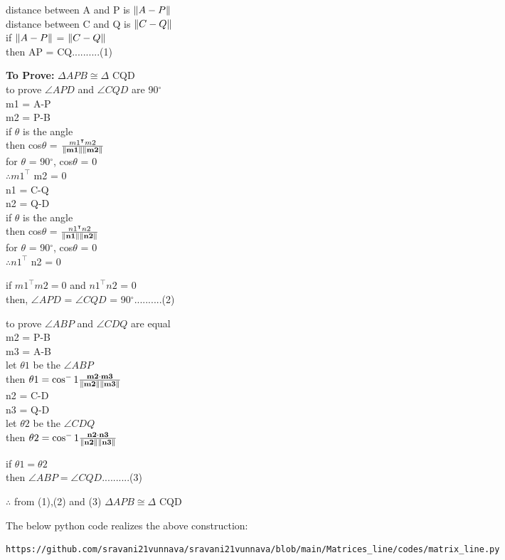 \documentclass[10pt, a4paper]{article}
\let\vec\mathbf
\begin{document}
	distance between A and P is $\norm{A-P}$\\
	distance between C and Q is $\norm{C-Q}$\\
	if $\norm{A-P}$ =  $\norm{C-Q}$\\
	then AP = CQ..........(1)
	
	\textbf{To Prove:}  $\Delta APB \cong \Delta$ CQD\\
	to prove $\angle {APD}$ and $\angle {CQD}$ are 90$^{\circ}$\\
	m1 = A-P\\
	m2 = P-B\\
	if $\theta$ is the angle\\
	then cos$\theta$ = $\frac{m1^\intercal m2}{\norm{\vec{m1}}\norm{\vec{m2}}}$\\
	for $\theta$ = 90$^{\circ}$, cos$\theta$ = 0\\
	$\therefore m1^\intercal$ m2 = 0\\
	n1 = C-Q\\
	n2 = Q-D\\
	if $\theta$ is the angle\\
	then cos$\theta$ = $\frac{n1^\intercal n2}{\norm{\vec{n1}}\norm{\vec{n2}}}$\\
	for $\theta$ = 90$^{\circ}$, cos$\theta$ = 0\\
	$\therefore n1^\intercal$ n2 = 0\\
	\begin{center}
	if 	$m1^\intercal m2 = 0$  and $n1^\intercal n2$ = 0\\
	then, $\angle {APD}$ = $\angle {CQD}$ = 90$^{\circ}$..........(2)\\
	\end{center}
	to prove $\angle {ABP}$ and $\angle {CDQ}$ are equal\\
	m2 = P-B\\
	m3 = A-B\\
	let $\theta1$ be the $\angle {ABP}$\\
	then $\theta1 = \cos^-1\frac{\vec{m2} \cdot \vec{m3}}{\norm{\vec{m2}}\norm{\vec{m3}}}$\\
	n2 = C-D\\
	n3 = Q-D\\
	let $\theta2$ be the $\angle {CDQ}$\\
	then $\theta2 = \cos^-1\frac{\vec{n2} \cdot \vec{n3}}{\norm{\vec{n2}}\norm{\vec{n3}}}$\\
	\begin{center}
	 		if $\theta1 = \theta2$\\
	 		then $\angle {ABP} = \angle {CQD}$..........(3)
	\end{center}
	\begin{center}
$\therefore$ from (1),(2) and (3)
$\Delta APB \cong \Delta$ CQD
	\end{center}
The below python code realizes the above construction:	
\begin{lstlisting}
https://github.com/sravani21vunnava/sravani21vunnava/blob/main/Matrices_line/codes/matrix_line.py
\end{lstlisting}
 
\end{document}
